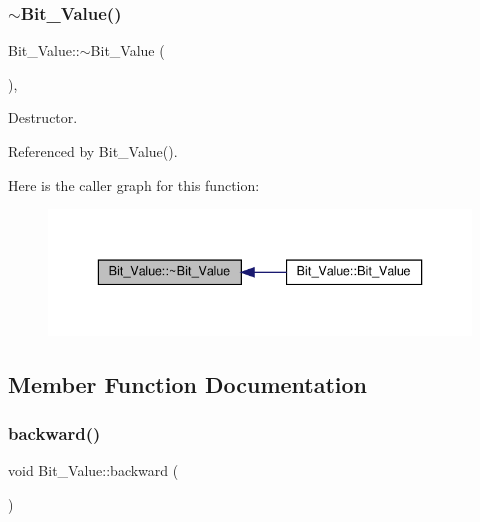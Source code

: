 \subsubsection{\texorpdfstring{$\sim$\+Bit\+\_\+\+Value()}{~Bit\_Value()}}
{\footnotesize\ttfamily Bit\+\_\+\+Value\+::$\sim$\+Bit\+\_\+\+Value (\begin{DoxyParamCaption}{ }\end{DoxyParamCaption})\hspace{0.3cm}{\ttfamily [override]}, {\ttfamily [default]}}



Destructor. 



Referenced by Bit\+\_\+\+Value().

Here is the caller graph for this function\+:
\nopagebreak
\begin{figure}[H]
\begin{center}
\leavevmode
\includegraphics[width=336pt]{df/d4b/classBit__Value_a29d884fb981b7171381735969e63f138_icgraph}
\end{center}
\end{figure}


\subsection{Member Function Documentation}
\mbox{\label{classBit__Value_a45f7af464b055789135126c85c65deea}} 
\subsubsection{\texorpdfstring{backward()}{backward()}}
{\footnotesize\ttfamily void Bit\+\_\+\+Value\+::backward (\begin{DoxyParamCaption}{ }\end{DoxyParamCaption})\hspace{0.3cm}{\ttfamily [private]}}




